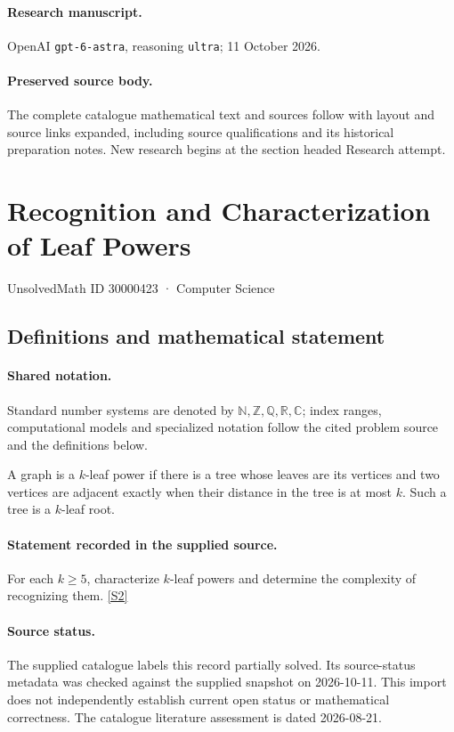 \documentclass[11pt]{article}
\begin{document}
\paragraph{Research manuscript.} OpenAI \texttt{gpt-6-astra}, reasoning \texttt{ultra}; 11 October 2026.
\paragraph{Preserved source body.} The complete catalogue mathematical text and sources follow with layout and source links expanded, including source qualifications and its historical preparation notes. New research begins at the section headed Research attempt.

\section{Recognition and Characterization of Leaf Powers}\label{30000423}
{\small UnsolvedMath ID 30000423 · Computer Science}
\subsection{Definitions and mathematical statement}

\paragraph{Shared notation.}Standard number systems are denoted by $\mathbb N,\mathbb Z,\mathbb Q,\mathbb R,\mathbb C$; index ranges, computational models and specialized notation follow the cited problem source and the definitions below.


A graph is a $k$-leaf power if there is a tree whose leaves are its vertices and two vertices are adjacent exactly when their distance in the tree is at most $k$. Such a tree is a $k$-leaf root.
\paragraph{Statement recorded in the supplied source.}
For each $k\geq5$, characterize $k$-leaf powers and determine the complexity of recognizing them. \href{https://doi.org/10.4171/owr/2006/07}{[S2]}
\paragraph{Source status.}
The supplied catalogue labels this record partially solved. Its source-status metadata was checked against the supplied snapshot on 2026-10-11. This import does not independently establish current open status or mathematical correctness. The catalogue literature assessment is dated 2026-08-21.
\end{document}
